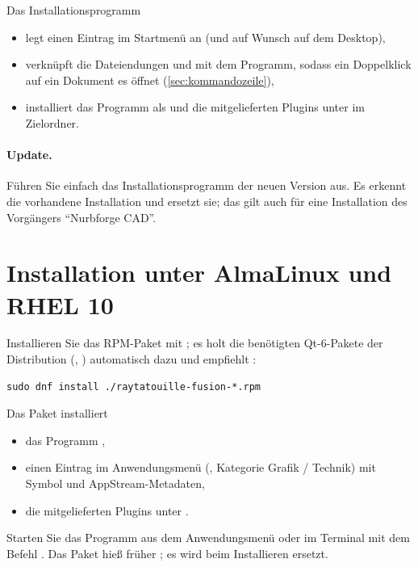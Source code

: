 Das Installationsprogramm
\begin{itemize}
  \item legt einen Eintrag  im Startmenü an (und auf Wunsch auf dem
    Desktop),
  \item verknüpft die Dateiendungen  und  mit dem Programm, sodass
    ein Doppelklick auf ein Dokument es öffnet (\autoref{sec:kommandozeile}),
  \item installiert das Programm als  und die
    mitgelieferten Plugins unter  im Zielordner.
\end{itemize}

\paragraph{Update.} Führen Sie einfach das Installationsprogramm der neuen Version aus. Es
erkennt die vorhandene Installation und ersetzt sie; das gilt auch für eine Installation des
Vorgängers \enquote{Nurbforge CAD}.

\section{Installation unter AlmaLinux und RHEL 10}\label{sec:inst-linux}

Installieren Sie das RPM-Paket mit ; es holt die benötigten Qt-6-Pakete der
Distribution (, ) automatisch dazu und empfiehlt
:

\begin{lstlisting}
sudo dnf install ./raytatouille-fusion-*.rpm
\end{lstlisting}

Das Paket installiert
\begin{itemize}
  \item das Programm ,
  \item einen Eintrag im Anwendungsmenü (, Kategorie Grafik /
    Technik) mit Symbol und AppStream-Metadaten,
  \item die mitgelieferten Plugins unter .
\end{itemize}

Starten Sie das Programm aus dem Anwendungsmenü oder im Terminal mit dem
Befehl . Das Paket hieß früher ; es wird beim
Installieren ersetzt.

